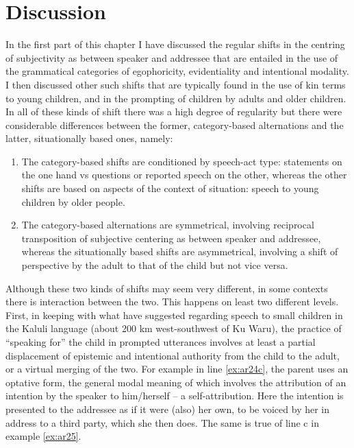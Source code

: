 \documentclass[output=paper]{langsci/langscibook}
\begin{document}

\section{Discussion}\label{s:ar6}

In the first part of this chapter I have discussed the regular shifts in the centring of subjectivity as between speaker and addressee that are entailed in the use of the grammatical categories of egophoricity, evidentiality and intentional modality. I then discussed other such shifts that are typically found in the use of kin terms to young children, and in the prompting of children by adults and older children. In all of these kinds of shift there was a high degree of regularity but there were considerable differences between the former, category-based alternations and the latter, situationally based ones, namely:

\begin{enumerate}
	\item The category-based shifts are conditioned by speech-act type: statements on the one hand vs questions or reported speech on the other, whereas the other shifts are based on aspects of the context of situation: speech to young children by older people.
	\item The category-based alternations are symmetrical, involving reciprocal transposition of subjective centering as between speaker and addressee, whereas the situationally based shifts are asymmetrical, involving a shift of perspective by the adult to that of the child but not vice versa.
\end{enumerate}

Although these two kinds of shifts may seem very different, in some contexts there is interaction between the two. This happens on least two different levels. First, in keeping with what \cite[451]{SanRoqueSchieffelin2018} have suggested regarding speech to small children in the Kaluli language (about 200 km west-southwest of Ku Waru), the practice of  “speaking for” the child in prompted utterances involves at least a partial displacement of epistemic and intentional authority from the child to the adult, or a virtual merging of the two. For example in line \ref{ex:ar24c}, the parent uses an optative form, the general modal meaning of which involves the attribution of an intention by the speaker to him/herself – a self-attribution. Here the intention is presented to the addressee as if it were (also) her own, to be voiced by her in address to a third party, which she then does. The same is true of line c in example \ref{ex:ar25}.  
\end{document}
